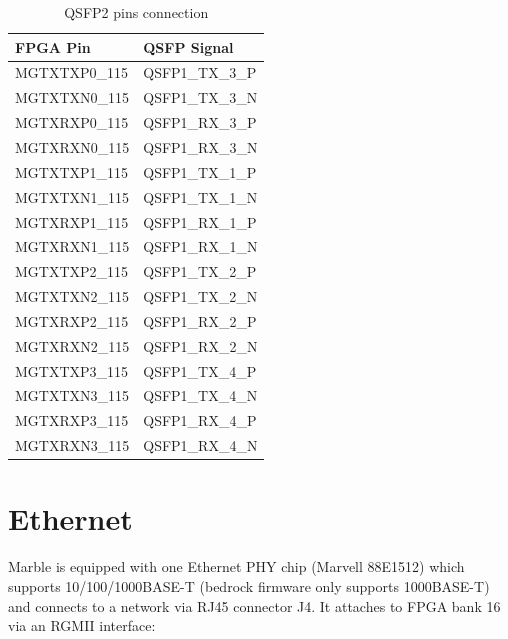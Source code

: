 \documentclass[12pt,oneside,a4]{article}
\begin{document}
\begin{table}[htbp]
\centering
\begin{tabular}{@{}ll@{}}
\toprule
FPGA Pin     & QSFP Signal  \\ \midrule
MGTXTXP0\_115 & QSFP1\_TX\_3\_P \\
MGTXTXN0\_115 & QSFP1\_TX\_3\_N \\
MGTXRXP0\_115 & QSFP1\_RX\_3\_P \\
MGTXRXN0\_115 & QSFP1\_RX\_3\_N \\ \midrule
MGTXTXP1\_115 & QSFP1\_TX\_1\_P \\
MGTXTXN1\_115 & QSFP1\_TX\_1\_N \\
MGTXRXP1\_115 & QSFP1\_RX\_1\_P \\
MGTXRXN1\_115 & QSFP1\_RX\_1\_N \\ \midrule
MGTXTXP2\_115 & QSFP1\_TX\_2\_P \\
MGTXTXN2\_115 & QSFP1\_TX\_2\_N \\
MGTXRXP2\_115 & QSFP1\_RX\_2\_P \\
MGTXRXN2\_115 & QSFP1\_RX\_2\_N \\ \midrule
MGTXTXP3\_115 & QSFP1\_TX\_4\_P \\
MGTXTXN3\_115 & QSFP1\_TX\_4\_N \\
MGTXRXP3\_115 & QSFP1\_RX\_4\_P \\
MGTXRXN3\_115 & QSFP1\_RX\_4\_N \\ \bottomrule
\end{tabular}
\caption{QSFP2 pins connection}
\label{tab:qsfp2-table}
\end{table}

\section{Ethernet}
Marble is equipped with one Ethernet PHY chip (Marvell 88E1512) which supports 10/100/1000BASE-T
(bedrock firmware only supports 1000BASE-T) and connects to a network via RJ45 connector \hbox{J4}.
It attaches to FPGA bank 16 via an RGMII interface:
\end{document}
